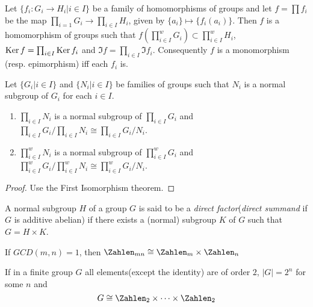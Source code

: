 \begin{theorem}
	Let $ \{f_i:G_i \to H_i | i \in I \} $ be a family of homomorphisms of groups and let $ f=\prod f_i $ be the map $ \prod_{i=1} G_i \to \prod_{i \in I} H_i $, given by $ \{a_i \} \mapsto \{f_i(a_i) \}$. Then $ f $ is a homomorphism of groups such that $ f(\prod_{i \in I}^{w}G_i)\subset \prod_{i \in I}^{w}H_i $, $ \operatorname{Ker} f = \prod_{i \in I} \operatorname{Ker} f_i $ and $ \Im f = \prod_{i \in I}\Im f_i $. Consequently $ f $ is a monomorphism (resp. epimorphism) iff each $ f_i $ is.
\end{theorem}
\begin{Corollary}
	Let $ \{G_i | i \in I \} $ and $ \{N_i | i\in I \} $ be families of groups such that $ N_i $ is a normal subgroup of $ G_i $ for each $ i \in I $.
	\begin{enumerate}
		\item $ \prod_{i \in I} N_i $ is a normal subgroup of $ \prod_{i \in I} G_i  $ and $ \prod_{i \in I} G_i/\prod_{i \in I} N_i  \cong \prod_{i \in I} G_i/N_i $.
		\item $ \prod_{i \in I}^w N_i $ is a normal subgroup of $ \prod_{i \in I}^w G_i  $ and $ \prod_{i \in I}^w G_i/\prod_{i \in I}^w N_i  \cong \prod_{i \in I}^w G_i/N_i $.
	\end{enumerate}
\end{Corollary}
\begin{proof}
	Use the First Isomorphism theorem.
\end{proof}
\begin{definition}
	A normal subgroup $ H $ of a group $ G $ is said to be a \textit{direct factor}(\textit{direct summand} if $ G $ is additive abelian) if there exists a (normal) subgroup $ K $ of $ G $ such that $ G = H \times K $.
\end{definition}
\begin{theorem}
	If $ GCD(m,n)=1 $, then $ \Zahlen_{mn}\cong \Zahlen_m \times \Zahlen_{n} $
\end{theorem}
\begin{theorem}
	If in a finite group $ G $ all elements(except the identity) are of order $ 2 $, $ |G|=2^n $ for some $ n $ and
	\begin{equation}
		G\cong \Zahlen_2 \times \cdots \times \Zahlen_2 \nonumber
	\end{equation}
\end{theorem}





